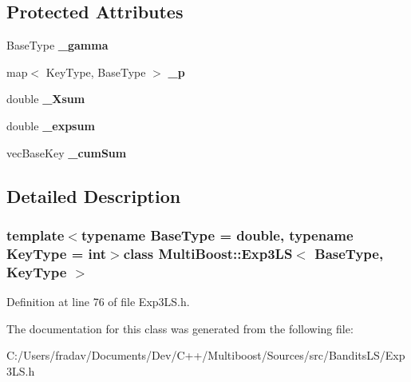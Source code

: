 \subsection*{Protected Attributes}
\begin{DoxyCompactItemize}
\item 
\hypertarget{classMultiBoost_1_1Exp3LS_a5fc60747afc993252cf549a327dfaa16}{Base\-Type {\bfseries \-\_\-gamma}}\label{classMultiBoost_1_1Exp3LS_a5fc60747afc993252cf549a327dfaa16}

\item 
\hypertarget{classMultiBoost_1_1Exp3LS_a0e3fe9ed00e26bd5359705acc2b4a364}{map$<$ Key\-Type, Base\-Type $>$ {\bfseries \-\_\-p}}\label{classMultiBoost_1_1Exp3LS_a0e3fe9ed00e26bd5359705acc2b4a364}

\item 
\hypertarget{classMultiBoost_1_1Exp3LS_a14cb5849a0bb1413a1d7736105f0fad3}{double {\bfseries \-\_\-\-Xsum}}\label{classMultiBoost_1_1Exp3LS_a14cb5849a0bb1413a1d7736105f0fad3}

\item 
\hypertarget{classMultiBoost_1_1Exp3LS_ad20fa8992e3284643994a1690e62758f}{double {\bfseries \-\_\-expsum}}\label{classMultiBoost_1_1Exp3LS_ad20fa8992e3284643994a1690e62758f}

\item 
\hypertarget{classMultiBoost_1_1Exp3LS_aa8e2fcaf726ba074138e446c2d59d180}{vec\-Base\-Key {\bfseries \-\_\-cum\-Sum}}\label{classMultiBoost_1_1Exp3LS_aa8e2fcaf726ba074138e446c2d59d180}

\end{DoxyCompactItemize}


\subsection{Detailed Description}
\subsubsection*{template$<$typename Base\-Type = double, typename Key\-Type = int$>$class Multi\-Boost\-::\-Exp3\-L\-S$<$ Base\-Type, Key\-Type $>$}



Definition at line 76 of file Exp3\-L\-S.\-h.



The documentation for this class was generated from the following file\-:\begin{DoxyCompactItemize}
\item 
C\-:/\-Users/fradav/\-Documents/\-Dev/\-C++/\-Multiboost/\-Sources/src/\-Bandits\-L\-S/Exp3\-L\-S.\-h\end{DoxyCompactItemize}
